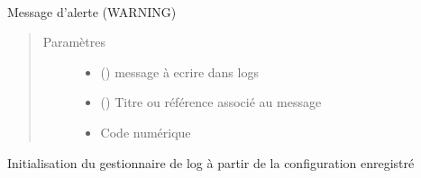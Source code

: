 \documentclass[letterpaper,10pt,french]{sphinxmanual}
\begin{document}
\begin{fulllineitems}
\label{\detokenize{classes/cfgloader:toolbox.logmng.CTracker}}~

\begin{fulllineitems}
\label{\detokenize{classes/cfgloader:toolbox.logmng.CTracker.alert_tracking}}
Message d’alerte (WARNING)
\begin{quote}\begin{description}
\item[{Paramètres}] \leavevmode\begin{itemize}
\item {} 
 () \textendash{} message à ecrire dans logs

\item {} 
 () \textendash{} Titre ou référence associé au message

\item {} 
 \textendash{} Code numérique

\end{itemize}

\end{description}\end{quote}

\end{fulllineitems}


\begin{fulllineitems}
\label{\detokenize{classes/cfgloader:toolbox.logmng.CTracker.config}}
Initialisation du gestionnaire de log à partir de la configuration enregistré


\end{fulllineitems}
\end{fulllineitems}
\end{document}
